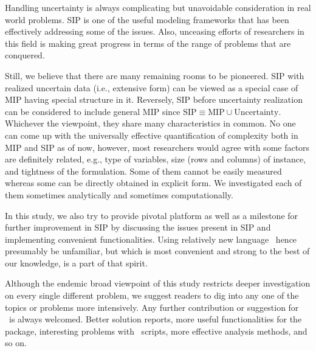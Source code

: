 Handling uncertainty is always complicating but unavoidable consideration in real world problems. SIP is one of the useful modeling frameworks that has been effectively addressing some of the issues. Also, unceasing efforts of researchers in this field is making great progress in terms of the range of problems that are conquered. 

Still, we believe that there are many remaining rooms to be pioneered. SIP with realized uncertain data (i.e., extensive form) can be viewed as a special case of MIP having special structure in it. Reversely, SIP before uncertainty realization can be considered to include general MIP since $\textrm{SIP}\equiv\textrm{MIP}\cup\textrm{Uncertainty}$. Whichever the viewpoint, they share many characteristics in common. No one can come up with the universally effective quantification of complexity both in MIP and SIP as of now, however, most researchers would agree with some factors are definitely related, e.g., type of variables, size (rows and columns) of instance, and tightness of the formulation. Some of them cannot be easily measured whereas some can be directly obtained in explicit form. We investigated each of them sometimes analytically and sometimes computationally.

In this study, we also try to provide pivotal platform as well as a milestone for further improvement in SIP by discussing the issues present in SIP and implementing convenient functionalities. Using relatively new language \julia\ hence presumably be unfamiliar, but which is most convenient and strong to the best of our knowledge, is a part of that spirit. 

Although the endemic broad viewpoint of this study restricts deeper investigation on every single different problem, we suggest readers to dig into any one of the topics or problems more intensively. Any further contribution or suggestion for \siplibtwo\ is always welcomed. Better solution reports, more useful functionalities for the package, interesting problems with \julia\ scripts, more effective analysis methods, and so on.
